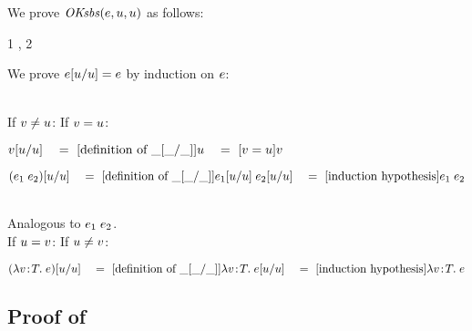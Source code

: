 We prove $\mathit{OKsbs}(e,u,u)$ as follows:
\begin{derivation}
\step{\varI\not\in\cvarvO{\expr}}
     {}
\step{\setI{\varI}\cap\cvarvO{\expr}=\emptyset}
     {1}
\step{\esbsok{\expr}{\varI}{\varI}}
     {, 2}
\end{derivation}
We prove $e[u/u]=e$ by induction on $e$:
\begin{bycase}
\Case{$\opO$, $\descopO$, $\pjop{\fnam}$}
\StepO{\esbs{\expr}{\varI}{\varI}=\expr}
      {}
\Case{$\var$}\\
If $v\neq u$:
\StepO{\esbs{\var}{\varI}{\varI}=\var}
      {}
\noindent
If $v=u$:
\begin{links}
$v[u/u]
 \\\hspace*{1em}=\ [\mbox{definition of $\_[\_/\_]$}]\\
 u
 \\\hspace*{1em}=\ [\mbox{$v=u$}]\\
 v$
\end{links}
\Case{$\appO$}
\begin{links}
$(e_1\;e_2)[u/u]
 \\\hspace*{1em}=\ [\mbox{definition of $\_[\_/\_]$}]\\
 e_1[u/u]\;e_2[u/u]
 \\\hspace*{1em}=\ [\mbox{induction hypothesis}]\\
 e_1\;e_2$
\end{links}
\Case{$\eqO$, $\iifO$}\\
Analogous to $\appO$.
\Case{$\absO$}\\
If $u=v$:
\StepO{\esbs{(\absO)}{\varI}{\varI}=\absO}
      {}
\noindent
If $u\neq v$:
\begin{links}
$(\lambda v\!:\!T.\;e)[u/u]
 \\\hspace*{1em}=\ [\mbox{definition of $\_[\_/\_]$}]\\
 \lambda v\!:\!T.\;e[u/u]
 \\\hspace*{1em}=\ [\mbox{induction hypothesis}]\\
 \lambda v\!:\!T.\;e$
\end{links}
\end{bycase}



\subsection*{Proof of }

